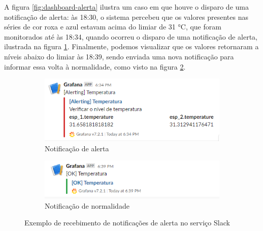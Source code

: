 \documentclass[../monografia.tex]{subfiles}
\begin{document}
A figura \ref{fig:dashboard-alerta} ilustra um caso em que houve o disparo de uma notificação de alerta: às 18:30, o sistema percebeu que os valores presentes nas séries de cor roxa e azul estavam acima do limiar de 31 °C, que foram monitorados até às 18:34, quando ocorreu o disparo de uma notificação de alerta, ilustrada na figura \ref{fig:slack-alerta}. Finalmente, podemos visualizar que os valores retornaram a níveis abaixo do limiar às 18:39, sendo enviada uma nova notificação para informar essa volta à normalidade, como visto na figura \ref{fig:slack-ok}.

\begin{figure}[h]
	\centering
	\begin{subfigure}[b]{0.7\textwidth}
		\includegraphics[width=\textwidth]{grafana-slack-alert.png}
		\caption{Notificação de alerta}
		\label{fig:slack-alerta}
	\end{subfigure}
	
	\begin{subfigure}[b]{0.7\textwidth}
		\includegraphics[width=\textwidth]{grafana-slack-ok.png}
		\caption{Notificação de normalidade}
		\label{fig:slack-ok}
	\end{subfigure}

	\caption{Exemplo de recebimento de notificações de alerta no serviço Slack}
	\label{fig:slack-notifications}
\end{figure}
\end{document}

